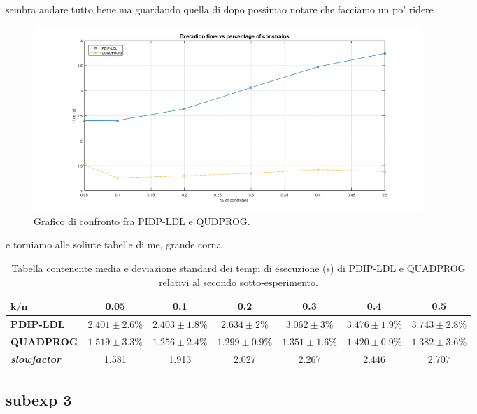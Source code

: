  sembra andare tutto bene,ma guardando quella di dopo possimao notare che facciamo un po' ridere
 
\begin{figure}[!h]
    \centering
    \includegraphics[width=\textwidth, height=7cm]{img/MU3.png}
    \caption{Grafico di confronto fra PIDP-LDL e QUDPROG. \label{fig:exp1.1}}
\end{figure}

e torniamo alle soliute tabelle di me, grande corna

\begin{table}[!h]
\centering
\begin{tabular}{l|c|c|c|c|c|c}

$\mathbf{k/n}$            & \textbf{0.05} & \textbf{0.1} & \textbf{0.2} & \textbf{0.3} & \textbf{0.4} & \textbf{0.5} \\ \hline
\textbf{PDIP-LDL}                    & $2.401 \pm 2.6\%$       & $2.403 \pm 1.8\%$       & $2.634     \pm 2\%$   & $3.062 \pm 3\%$      & $3.476 \pm 1.9\%$      & $3.743 \pm 2.8\%$       \\
\textbf{QUADPROG}                    & $1.519 \pm 3.3\%$       & $1.256 \pm 2.4\%$       & $1.299 \pm 0.9\%$       & $1.351 \pm 1.6\%$       & $1.420 \pm 0.9\%$       & $1.382 \pm 3.6\%$       \\
\textbf{\textit{slowfactor}} & 1.581        & 1.913       & 2.027       & 2.267       & 2.446       & 2.707 
\end{tabular}
\caption{Tabella contenente media e deviazione standard dei tempi di esecuzione (s) di PDIP-LDL e QUADPROG relativi al secondo sotto-esperimento.\label{tab:ldlqp2}}
\end{table}

\subsection*{subexp 3}

